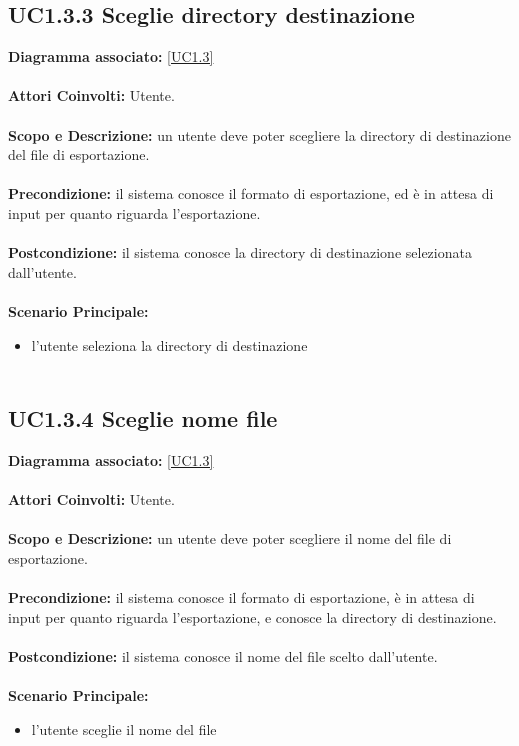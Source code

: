 \subsection{UC1.3.3 Sceglie directory destinazione}
\textbf{Diagramma associato:}
\ref{UC1.3} \\ \\
\textbf{Attori Coinvolti:}
Utente. \\ \\
\textbf{Scopo e Descrizione:}
un utente deve poter scegliere la directory di destinazione del file di esportazione. \\ \\
\textbf{Precondizione:}
il sistema conosce il formato di esportazione, ed è in attesa di input per quanto riguarda l'esportazione. \\ \\
\textbf{Postcondizione:}
il sistema conosce la directory di destinazione selezionata dall'utente. \\ \\
\textbf{Scenario Principale:}
\begin{itemize}
\item l'utente seleziona la directory di destinazione
\\ \\ \end{itemize}


\subsection{UC1.3.4 Sceglie nome file}
\textbf{Diagramma associato:}
\ref{UC1.3} \\ \\
\textbf{Attori Coinvolti:}
Utente. \\ \\
\textbf{Scopo e Descrizione:}
un utente deve poter scegliere il nome del file di esportazione. \\ \\
\textbf{Precondizione:}
il sistema conosce il formato di esportazione, è in attesa di input per quanto riguarda l'esportazione, e conosce la directory di destinazione. \\ \\
\textbf{Postcondizione:}
il sistema conosce il nome del file scelto dall'utente. \\ \\
\textbf{Scenario Principale:}
\begin{itemize}
\item l'utente sceglie il nome del file
\\ \\ \end{itemize}


